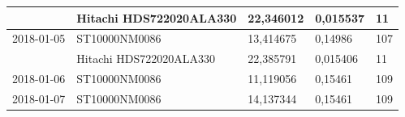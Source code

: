 \documentclass{VUMIFPSkursinis}
\begin{document}
\begin{table}[H]
{\begin{tabular}{|c|l|l|l|l|}
\cellcolor[HTML]{C0C0C0}                        & Hitachi HDS722020ALA330               & 22,346012                              & 0,015537                             & 11                                   \\ \hline
2018-01-05                                      & ST10000NM0086                         & 13,414675                              & 0,14986                              & 107                                  \\ \hline
\cellcolor[HTML]{C0C0C0}                        & Hitachi HDS722020ALA330               & 22,385791                              & 0,015406                             & 11                                   \\ \hline
2018-01-06                                      & ST10000NM0086                         & 11,119056                              & 0,15461                              & 109                                  \\ \hline
2018-01-07                                      & ST10000NM0086                         & 14,137344                              & 0,15461                              & 109                                  \\ \hline
\end{tabular}}
\end{table}
\end{document}
